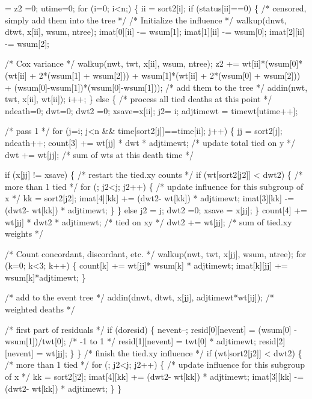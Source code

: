 \documentclass{article}
\begin{document}
\begin{nwchunk}
=
 z2 =0; utime=0;
 for (i=0; i<n;) \{
     ii = sort2[i];  
     if (status[ii]==0) \{ /* censored, simply add them into the tree */
         /* Initialize the influence */
         walkup(dnwt, dtwt, x[ii], wsum, ntree);
         imat[0][ii] -= wsum[1];
         imat[1][ii] -= wsum[0];
         imat[2][ii] -= wsum[2];
         
         /* Cox variance */
         walkup(nwt, twt, x[ii], wsum, ntree);
         z2 += wt[ii]*(wsum[0]*(wt[ii] + 2*(wsum[1] + wsum[2])) +
                       wsum[1]*(wt[ii] + 2*(wsum[0] + wsum[2])) +
                       (wsum[0]-wsum[1])*(wsum[0]-wsum[1]));
         /* add them to the tree */
         addin(nwt, twt, x[ii], wt[ii]);
         i++;
     \}
     else \{  /* process all tied deaths at this point */
         ndeath=0; dwt=0; 
         dwt2 =0; xsave=x[ii]; j2= i;
         adjtimewt = timewt[utime++];
 
         /* pass 1 */
         for (j=i; j<n && time[sort2[j]]==time[ii]; j++) \{
             jj = sort2[j];
             ndeath++; 
             count[3] += wt[jj] * dwt * adjtimewt;  /* update total tied on y */
             dwt += wt[jj];   /* sum of wts at this death time */
 
             if (x[jj] != xsave) \{  /* restart the tied.xy counts */
                 if (wt[sort2[j2]] < dwt2) \{ /* more than 1 tied */
                     for (; j2<j; j2++) \{
                         /* update influence for this subgroup of x */
                         kk = sort2[j2];
                         imat[4][kk] += (dwt2- wt[kk]) * adjtimewt;
                         imat[3][kk] -= (dwt2- wt[kk]) * adjtimewt;
                     \}
                 \} else j2 = j;
                 dwt2 =0;
                 xsave = x[jj];
             \}
             count[4] += wt[jj] * dwt2 * adjtimewt; /* tied on xy */
             dwt2 += wt[jj]; /* sum of tied.xy weights */
 
             /* Count concordant, discordant, etc. */
             walkup(nwt, twt, x[jj], wsum, ntree);
             for (k=0; k<3; k++) \{
                 count[k] += wt[jj]* wsum[k] * adjtimewt;
                 imat[k][jj] += wsum[k]*adjtimewt;
             \}
 
             /* add to the event tree */
             addin(dnwt, dtwt, x[jj], adjtimewt*wt[jj]);  /* weighted deaths */
 
             /* first part of residuals */
             if (doresid) \{
                 nevent--;
                 resid[0][nevent] = (wsum[0] - wsum[1])/twt[0]; /* -1 to 1 */
                 resid[1][nevent] = twt[0] * adjtimewt;
                 resid[2][nevent] = wt[jj];
             \}
         \}
         /* finish the tied.xy influence */
         if (wt[sort2[j2]] < dwt2) \{ /* more than 1 tied */
             for (; j2<j; j2++) \{
                 /* update influence for this subgroup of x */
                 kk = sort2[j2];
                 imat[4][kk] += (dwt2- wt[kk]) * adjtimewt;
                 imat[3][kk] -= (dwt2- wt[kk]) * adjtimewt;
             \}
         \}
   

\end{nwchunk}
\end{document}
